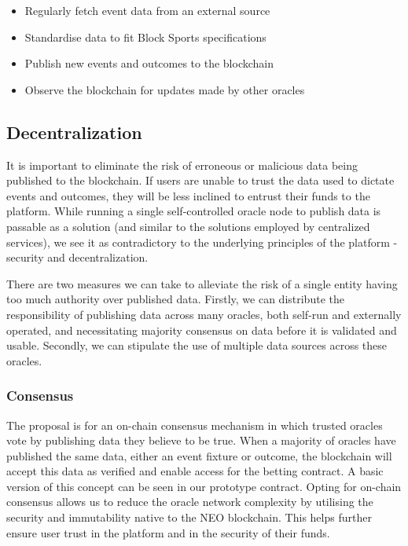 \documentclass{article}
\begin{document}
\begin{itemize}
	\item Regularly fetch event data from an external source
	\item Standardise data to fit Block Sports specifications
	\item Publish new events and outcomes to the blockchain
	\item Observe the blockchain for updates made by other oracles
\end{itemize}

	\subsection{Decentralization}
	It is important to eliminate the risk of erroneous or malicious data being published to the blockchain. If users are unable to trust the data used to dictate events and outcomes, they will be less inclined to entrust their funds to the platform. While running a single self-controlled oracle node to publish data is passable as a solution (and similar to the solutions employed by centralized services), we see it as contradictory to the underlying principles of the platform - security and decentralization. 

There are two measures we can take to alleviate the risk of a single entity having too much authority over published data. Firstly, we can distribute the responsibility of publishing data across many oracles, both self-run and externally operated, and necessitating majority consensus on data before it is validated and usable. Secondly, we can stipulate the use of multiple data sources across these oracles. 

		\subsubsection{Consensus}
The proposal is for an on-chain consensus mechanism in which trusted oracles vote by publishing data they believe to be true. When a majority of oracles have published the same data, either an event fixture or outcome, the blockchain will accept this data as verified and enable access for the betting contract. A basic version of this concept can be seen in our prototype contract. Opting for on-chain consensus allows us to reduce the oracle network complexity by utilising the security and immutability native to the NEO blockchain. This helps further ensure user trust in the platform and in the security of their funds. 
\end{document}
